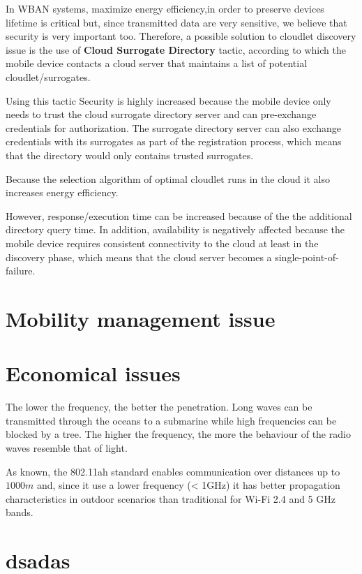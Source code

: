 \documentclass[sigchi]{acmart}
\begin{document}
In WBAN systems, maximize energy efficiency,in order to preserve devices lifetime is critical but, since transmitted data are very sensitive, we believe that security is very important too. Therefore, a possible solution to cloudlet discovery issue is the use of \textbf{Cloud Surrogate Directory} tactic, according to which the mobile device contacts a cloud server that maintains a list of potential cloudlet/surrogates. 

Using this tactic Security is highly increased because the mobile device only needs to trust the cloud surrogate directory server and can pre-exchange credentials for authorization. The surrogate directory server can also exchange credentials with its surrogates as part of the registration process, which means that the directory would only contains trusted surrogates.

Because the selection algorithm of optimal cloudlet runs in the cloud it also increases energy efficiency. 

However, response/execution time can be increased because of the the additional directory
query time. In addition, availability is negatively affected
because the mobile device requires consistent connectivity to
the cloud at least in the discovery phase, which means that
the cloud server becomes a single-point-of-failure.

\section{Mobility management issue}

\section{Economical issues}

The lower the frequency, the better the penetration. Long waves can be transmitted through the oceans to a submarine while high frequencies can be blocked by a tree. The higher the frequency, the more the behaviour of the radio waves resemble that of light.

As known, the 802.11ah standard enables communication over distances up to $1000 m$ and, since it use a lower frequency (< 1GHz) it has better propagation characteristics in outdoor scenarios than traditional for Wi-Fi 2.4 and 5 GHz bands. 



\section{dsadas}
\end{document}
